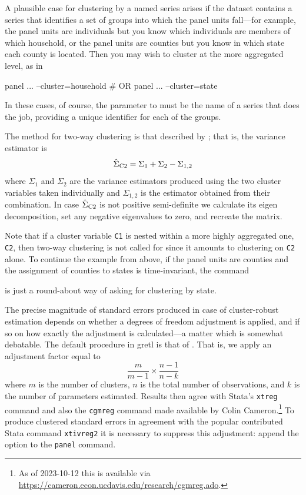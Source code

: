 A plausible case for clustering by a named series arises if the
dataset contains a series that identifies a set of groups into which
the panel units fall---for example, the panel units are individuals
but you know which individuals are members of which household, or the
panel units are counties but you know in which state each county is
located. Then you may wish to cluster at the more aggregated level, as
in
\begin{code}
panel ... --cluster=household
# OR
panel ... --cluster=state
\end{code}
In these cases, of course, the parameter to  must be
the name of a series that does the job, providing a unique identifier
for each of the groups.

The method for two-way clustering is that described by
\cite{CGM2011}; that is, the variance estimator is
\[
\hat{\Sigma}_{\rm C2} = \Sigma_1 + \Sigma_2 - \Sigma_{1,2}
\]
where $\Sigma_1$ and
$\Sigma_2$ are the variance estimators produced using the two cluster
variables taken individually and
$\Sigma_{1,2}$ is the estimator obtained from their combination.  In
case $\hat{\Sigma}_{\rm
  C2}$ is not positive semi-definite we calculate its eigen
decomposition, set any negative eigenvalues to zero, and recreate the
matrix.

Note that if a cluster variable \texttt{C1} is nested within a more
highly aggregated one, \texttt{C2}, then two-way clustering is not
called for since it amounts to clustering on \texttt{C2} alone. To
continue the example from above, if the panel units are counties and
the assignment of counties to states is time-invariant, the command
is just a round-about way of asking for clustering by state.

The precise magnitude of standard errors produced in case of
cluster-robust estimation depends on whether a degrees of freedom
adjustment is applied, and if so on how exactly the adjustment is
calculated---a matter which is somewhat debatable. The default
procedure in gretl is that of \cite{CGM2011}. That is, we apply an
adjustment factor equal to
\[
  \frac{m}{m-1} \times \frac{n-1}{n-k}
\]
where $m$ is the number of clusters, $n$ is the total number of
observations, and $k$ is the number of parameters estimated. Results
then agree with \textsf{Stata}'s \texttt{xtreg} command and also the
\texttt{cgmreg} command made available by Colin Cameron.\footnote{As
  of 2023-10-12 this is available via
  \url{https://cameron.econ.ucdavis.edu/research/cgmreg.ado}.}  To
produce clustered standard errors in agreement with the popular
contributed \textsf{Stata} command \texttt{xtivreg2} it is necessary
to suppress this adjustment: append the  option to
the \texttt{panel} command.


